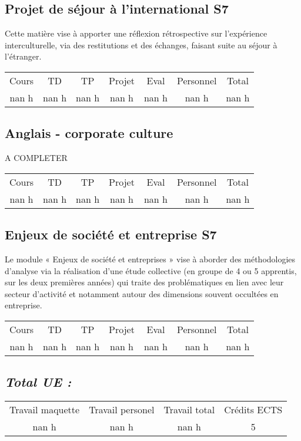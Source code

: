 \subsection{Projet de séjour à l'international S7}%
\label{subsec:ProjetdesjourlinternationalS7}%

%
Cette matière vise à apporter une réflexion rétrospective sur l'expérience interculturelle, via des restitutions et des échanges, faisant suite au séjour à l'étranger.%
\begin{longtable}{c c c c c c c}%
\hline%
Cours&TD&TP&Projet&Eval&Personnel&Total\\%
nan h&nan h&nan h&nan h&nan h&nan h&nan h\\%
\hline%
\end{longtable}%
\subsection{Anglais {-} corporate culture }%
\label{subsec:Anglais{-}corporateculture}%

%
A COMPLETER%
\begin{longtable}{c c c c c c c}%
\hline%
Cours&TD&TP&Projet&Eval&Personnel&Total\\%
nan h&nan h&nan h&nan h&nan h&nan h&nan h\\%
\hline%
\end{longtable}%
\subsection{Enjeux de société et entreprise S7}%
\label{subsec:EnjeuxdesocitetentrepriseS7}%

%
Le module « Enjeux de société et entreprises » vise à aborder des méthodologies d’analyse via la réalisation d’une étude collective (en groupe de 4 ou 5 apprentis, sur les deux premières années) qui traite des problématiques en lien avec leur secteur d’activité et notamment autour des dimensions souvent occultées en entreprise.%
\begin{longtable}{c c c c c c c}%
\hline%
Cours&TD&TP&Projet&Eval&Personnel&Total\\%
nan h&nan h&nan h&nan h&nan h&nan h&nan h\\%
\hline%
\end{longtable}%
\subsection{\textit{Total UE :}}%
\label{subsec:textitTotalUE}%

%
\begin{longtable}{c c c c}%
\hline%
Travail maquette&Travail personel&Travail total&Crédits ECTS\\%
nan h&nan h&nan h&5\\%
\hline%
\end{longtable}